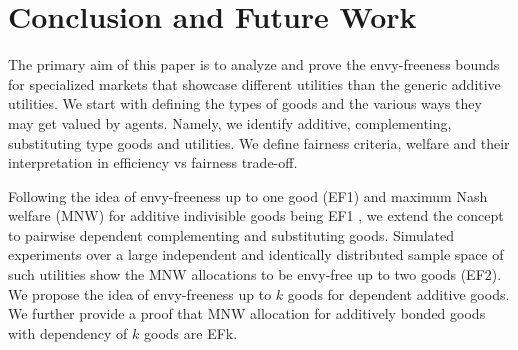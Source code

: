 





\section{Conclusion and Future Work}
\label{section_conclusion}

The primary aim of this paper is to analyze and prove the envy-freeness bounds for specialized markets that showcase different utilities than the generic additive utilities. We start with defining the types of goods and the various ways they may get valued by agents. Namely, we identify additive, complementing, substituting type goods and utilities. We define fairness criteria, welfare and their interpretation in efficiency vs fairness trade-off. 

Following the idea of envy-freeness up to one good (EF1) and maximum Nash welfare (MNW) for additive indivisible goods being EF1 \cite{caragiannis2016unreasonable}, we extend the concept to pairwise dependent complementing and substituting goods. Simulated experiments over a large independent and identically distributed sample space of such utilities show the MNW allocations to be envy-free up to two goods (EF2). We propose the idea of envy-freeness up to $k$ goods for dependent additive goods. We further provide a proof that MNW allocation for additively bonded goods with depend\-ency of $k$ goods are EFk.

